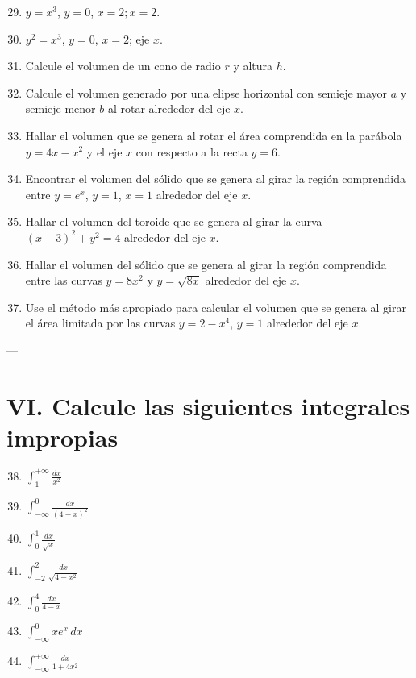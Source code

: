 \documentclass[12pt]{article}
\begin{document}
\begin{enumerate}
\setcounter{enumi}{28}

\item $y=x^3$, $y=0$, $x=2;x=2$.
\item $y^2=x^3$, $y=0$, $x=2$; eje $x$.
\item Calcule el volumen de un cono de radio $r$ y altura $h$.
\item Calcule el volumen generado por una elipse horizontal con semieje mayor $a$ y semieje menor $b$ al rotar alrededor del eje $x$.
\item Hallar el volumen que se genera al rotar el área comprendida en la parábola $y=4x-x^2$ y el eje $x$ con respecto a la recta $y=6$.
\item Encontrar el volumen del sólido que se genera al girar la región comprendida entre $y=e^x$, $y=1$, $x=1$ alrededor del eje $x$.
\item Hallar el volumen del toroide que se genera al girar la curva $(x-3)^2+y^2=4$ alrededor del eje $x$.
\item Hallar el volumen del sólido que se genera al girar la región comprendida entre las curvas $y=8x^2$ y $y=\sqrt{8x}$ alrededor del eje $x$.
\item Use el método más apropiado para calcular el volumen que se genera al girar el área limitada por las curvas $y=2-x^4$, $y=1$ alrededor del eje $x$.
\end{enumerate}

---

\section*{VI. Calcule las siguientes integrales impropias}

\begin{enumerate}
\setcounter{enumi}{37}
\item $\displaystyle \int_{1}^{+\infty} \frac{dx}{x^2}$
\item $\displaystyle \int_{-\infty}^{0} \frac{dx}{(4-x)^2}$
\item $\displaystyle \int_{0}^{1} \frac{dx}{\sqrt{x}}$
\item $\displaystyle \int_{-2}^{2} \frac{dx}{\sqrt{4-x^2}}$
\item $\displaystyle \int_{0}^{4} \frac{dx}{4-x}$
\item $\displaystyle \int_{-\infty}^{0} xe^x\,dx$
\item $\displaystyle \int_{-\infty}^{+\infty} \frac{dx}{1+4x^2}$
\end{enumerate}
\end{document}
